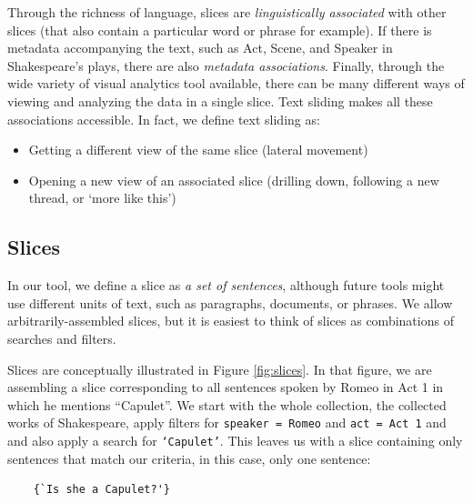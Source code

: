 \documentclass{sig-alternate}
\newcommand{\code}[1] {\texttt{#1}}
\begin{document}
Through the richness of language, slices are \emph{linguistically associated} with other slices (that also contain a particular word or phrase for example). If there is metadata accompanying the text, such as Act, Scene, and Speaker in Shakespeare's plays, there are also \emph{metadata associations}. Finally,  through the wide variety of visual analytics tool available, there can be many different ways of viewing and analyzing the data in a single slice. Text sliding makes all these associations accessible. 
 In fact, we define text sliding as:
\begin{itemize}
	\item Getting a different view of the same slice (lateral movement)
	\item Opening a new view of an associated slice (drilling down, following a new thread, or `more like this')
\end{itemize}

\subsection{Slices}
In our tool, we define a slice as \emph{a set of sentences}, although future tools might use different units of text, such as paragraphs, documents, or phrases. We allow arbitrarily-assembled slices, but it is easiest to think of slices as combinations of searches and filters. 

Slices are conceptually illustrated in Figure \ref{fig:slices}. In that figure, we are assembling a slice corresponding to all sentences spoken by Romeo  in Act 1 in which he mentions ``Capulet''. We start with the whole collection, the collected works of Shakespeare, apply filters for \code{speaker = Romeo} and \code{act = Act 1}  and and also apply a search for \code{`Capulet'}. This leaves us with a slice containing only sentences that match our criteria, in this case, only one sentence:
\begin{verbatim}
 	{`Is she a Capulet?'}
\end{verbatim}
\end{document}
